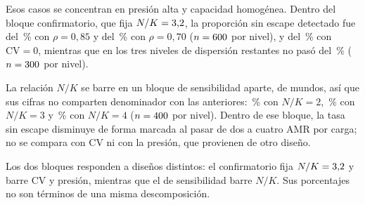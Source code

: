 Esos \NFourHStarGtThreeN{} casos se concentran en presión alta y capacidad
homogénea. Dentro del bloque confirmatorio, que fija $N/K=3{,}2$, la
proporción sin escape detectado fue del \NFourNoEscRhoHigh\,\% con
$\rho=0{,}85$ y del \NFourNoEscRhoLow\,\% con $\rho=0{,}70$
($n=600$ por nivel), y del \NFourNoEscCvZero\,\% con
$\mathrm{CV}=0$, mientras que en los tres niveles de dispersión
restantes no pasó del \NFourNoEscCvMid\,\%
($n=300$ por nivel).

La relación $N/K$ se barre en un bloque de sensibilidad aparte, de
\NFourRatioBlockN{} mundos, así que sus cifras no comparten denominador con las
anteriores: \NFourNoEscNkTwo\,\% con $N/K=2$, \NFourNoEscNkThree\,\% con $N/K=3$ y
\NFourNoEscNkFour\,\% con $N/K=4$ ($n=400$ por nivel). Dentro de
ese bloque, la tasa sin escape disminuye de forma marcada al pasar de dos a cuatro
AMR por carga; no se compara con CV ni con la presión, que provienen de otro
diseño.

Los dos bloques responden a diseños distintos: el confirmatorio fija
$N/K=3{,}2$ y barre CV y presión, mientras que el de sensibilidad
barre $N/K$. Sus porcentajes no son términos de una misma descomposición.



